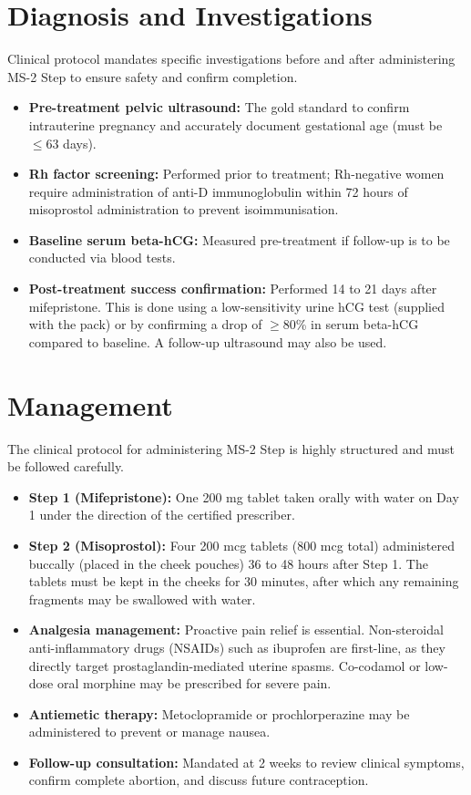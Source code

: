 \section*{Diagnosis and Investigations}
Clinical protocol mandates specific investigations before and after administering MS-2 Step to ensure safety and confirm completion.
\begin{itemize}
    \item \textbf{Pre-treatment pelvic ultrasound:} The gold standard to confirm intrauterine pregnancy and accurately document gestational age (must be $\le 63$ days).
    \item \textbf{Rh factor screening:} Performed prior to treatment; Rh-negative women require administration of anti-D immunoglobulin within 72 hours of misoprostol administration to prevent isoimmunisation.
    \item \textbf{Baseline serum beta-hCG:} Measured pre-treatment if follow-up is to be conducted via blood tests.
    \item \textbf{Post-treatment success confirmation:} Performed 14 to 21 days after mifepristone. This is done using a low-sensitivity urine hCG test (supplied with the pack) or by confirming a drop of $\ge 80$\% in serum beta-hCG compared to baseline. A follow-up ultrasound may also be used.
\end{itemize}

\section*{Management}
The clinical protocol for administering MS-2 Step is highly structured and must be followed carefully.
\begin{itemize}
    \item \textbf{Step 1 (Mifepristone):} One 200 mg tablet taken orally with water on Day 1 under the direction of the certified prescriber.
    \item \textbf{Step 2 (Misoprostol):} Four 200 mcg tablets (800 mcg total) administered buccally (placed in the cheek pouches) 36 to 48 hours after Step 1. The tablets must be kept in the cheeks for 30 minutes, after which any remaining fragments may be swallowed with water.
    \item \textbf{Analgesia management:} Proactive pain relief is essential. Non-steroidal anti-inflammatory drugs (NSAIDs) such as ibuprofen are first-line, as they directly target prostaglandin-mediated uterine spasms. Co-codamol or low-dose oral morphine may be prescribed for severe pain.
    \item \textbf{Antiemetic therapy:} Metoclopramide or prochlorperazine may be administered to prevent or manage nausea.
    \item \textbf{Follow-up consultation:} Mandated at 2 weeks to review clinical symptoms, confirm complete abortion, and discuss future contraception.
\end{itemize}

